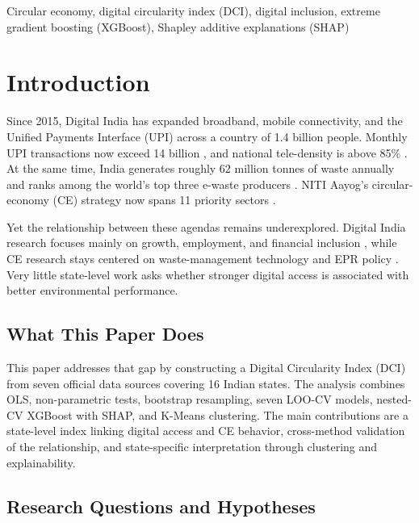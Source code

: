 \documentclass[conference]{IEEEtran}
\begin{document}
\begin{IEEEkeywords}
Circular economy, digital circularity index (DCI), digital inclusion, extreme gradient boosting (XGBoost), Shapley additive explanations (SHAP)
\end{IEEEkeywords}

\section{Introduction}

Since 2015, Digital India has expanded broadband, mobile connectivity, and the Unified Payments Interface (UPI) across a country of 1.4 billion people. Monthly UPI transactions now exceed 14 billion \cite{npci2025}, and national tele-density is above 85\% \cite{trai2024}. At the same time, India generates roughly 62 million tonnes of waste annually and ranks among the world's top three e-waste producers \cite{cpcb2023}. NITI Aayog's circular-economy (CE) strategy now spans 11 priority sectors \cite{nitiCE2021}.

Yet the relationship between these agendas remains underexplored. Digital India research focuses mainly on growth, employment, and financial inclusion \cite{meity2023}, while CE research stays centered on waste-management technology and EPR policy \cite{geissdoerfer2017}. Very little state-level work asks whether stronger digital access is associated with better environmental performance.

\subsection{What This Paper Does}

This paper addresses that gap by constructing a Digital Circularity Index (DCI) from seven official data sources covering 16 Indian states. The analysis combines OLS, non-parametric tests, bootstrap resampling, seven LOO-CV models, nested-CV XGBoost with SHAP, and K-Means clustering. The main contributions are a state-level index linking digital access and CE behavior, cross-method validation of the relationship, and state-specific interpretation through clustering and explainability.

\subsection{Research Questions and Hypotheses}
\end{document}
